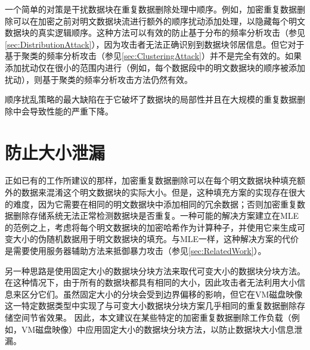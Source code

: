 一个简单的对策是干扰数据块在重复数据删除处理中顺序。例如，加密重复数据删除可以在加密之前对明文数据块流进行额外的顺序扰动添加处理，以隐藏每个明文数据块的真实逻辑顺序。这种方法可以有效的防止基于分布的频率分析攻击（参见\ref{sec:DistributionAttack}），因为攻击者无法正确识别到数据块邻居信息。但它对于基于聚类的频率分析攻击（参见\ref{sec:ClusteringAttack}）并不是完全有效的。如果添加扰动仅在很小的范围内进行（例如，每个数据段中的明文数据块的顺序被添加扰动），则基于聚类的频率分析攻击方法仍然有效。

顺序扰乱策略的最大缺陷在于它破坏了数据块的局部性并且在大规模的重复数据删除中会导致性能的严重下降。

\section{防止大小泄漏}

正如已有的工作所建议的那样，加密重复数据删除可以在每个明文数据块种填充额外的数据来混淆这个明文数据块的实际大小。但是，这种填充方案的实现存在很大的难度，因为它需要在相同的明文数据块中添加相同的冗余数据；否则加密重复数据删除存储系统无法正常检测数据块是否重复。一种可能的解决方案建立在MLE的范例之上，考虑将每个明文数据块的加密哈希作为计算种子，并使用它来生成可变大小的伪随机数据用于明文数据块的填充。与MLE一样，这种解决方案的代价是需要使用服务器辅助方法来抵御暴力攻击（参见\ref{sec:RelatedWork}）。   


另一种思路是使用固定大小的数据块分块方法来取代可变大小的数据块分块方法。在这种情况下，由于所有的数据块都具有相同的大小，因此攻击者无法利用大小信息来区分它们。虽然固定大小的分块会受到边界偏移的影响，但它在VM磁盘映像这一特定数据类型中实现了与可变大小数据块分块方案几乎相同的重复数据删除存储空间节省效果。 因此，本文建议在某些特定的加密重复数据删除工作负载（例如，VM磁盘映像）中应用固定大小的数据块分块方法，以防止数据块大小信息泄漏。
